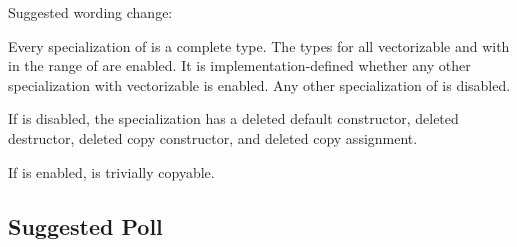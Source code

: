 Suggested wording change:

\begin{wgText}
  \setcounter{Paras}{1}
\pnum
Every specialization of  is a complete type.
The types  for all vectorizable
 and with  in the range of  are enabled.
It is implementation-defined whether any other  specialization
with vectorizable  is enabled.
Any other specialization of  is disabled.

If  is disabled, the specialization has a
deleted default constructor, deleted destructor, deleted copy constructor, and
deleted copy assignment.

If  is enabled,  is
trivially copyable.
\end{wgText}


\subsection{Suggested Poll}


